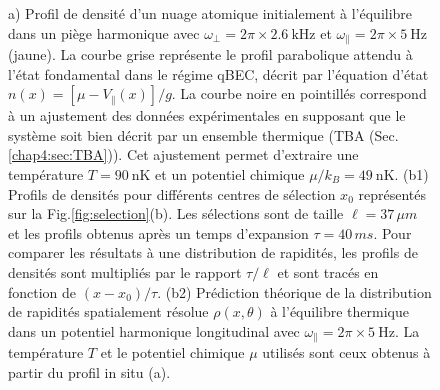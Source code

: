 \begin{figure}[H]
	\caption{a) Profil de densité d’un nuage atomique initialement à l’équilibre dans un piège harmonique avec $\omega_\perp = 2 \pi \times  2.6~\mathrm{kHz}$ et $\omega_\parallel = 2 \pi \times 5~\mathrm{Hz}$ (jaune). La courbe grise représente le profil parabolique attendu à l’état fondamental dans le régime \gls{qBEC}, décrit par l’équation d’état $n(x) = [\mu - V_\parallel(x)]/g$. La courbe noire en pointillés correspond à un ajustement des données expérimentales en supposant que le système soit bien décrit par un ensemble thermique (\gls{TBA} (Sec. \ref{chap4:sec:TBA})). Cet ajustement permet d’extraire une température $T = 90~\mathrm{nK}$ et un potentiel chimique $\mu/k_B = 49~\mathrm{nK}$.
	(b1) Profils de densités pour différents centres de sélection $x_0$ représentés sur la Fig.\ref{fig:selection}(b). Les sélections sont de taille $\ell = 37\, \mu m$ et les profils obtenus après un temps d’expansion $\tau =  40 \, ms$. Pour comparer les résultats à une distribution de rapidités, les profils de densités sont multipliés par le rapport $\tau/ \ell$ et sont tracés en fonction de $(x-x_0)/\tau$. (b2) Prédiction théorique de la distribution de rapidités spatialement résolue $\rho ( x , \theta)$ à l’équilibre thermique dans un potentiel harmonique longitudinal avec $\omega_\parallel = 2 \pi \times 5~\mathrm{Hz}$. La température $T$ et le potentiel chimique $\mu$ utilisés sont ceux obtenus à partir du profil in situ (a).}
	\label{fig:expansion}
\end{figure}